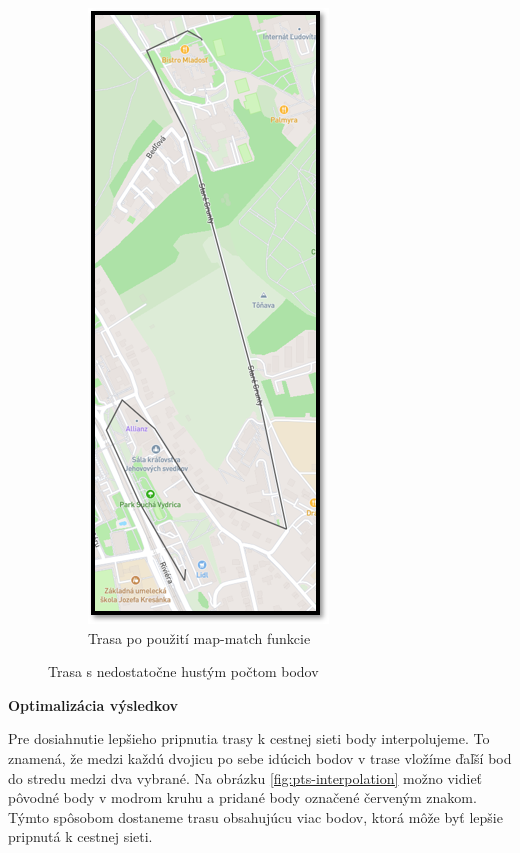 \begin{figure}[H]
\begin{subfigure}{0.45\textwidth}
        \includegraphics[width=.5\textwidth]{img/map-match rozdiel/malo bodov po.png}
        \caption{Trasa po použití map-match funkcie}
        \label{fig:map-match-low-points-after}
    \end{subfigure}
    \caption{Trasa s nedostatočne hustým počtom bodov}
    \label{fig:map-match-low-points}
\end{figure}

\noindent\textbf{Optimalizácia výsledkov}

Pre dosiahnutie lepšieho pripnutia trasy k cestnej sieti body interpolujeme. To znamená, že medzi každú dvojicu po sebe idúcich bodov v trase vložíme ďaľší bod do stredu medzi dva vybrané. Na obrázku \ref{fig:pts-interpolation} možno vidieť pôvodné body v modrom kruhu a pridané body označené červeným znakom. Týmto spôsobom dostaneme trasu obsahujúcu viac bodov, ktorá môže byť lepšie pripnutá k cestnej sieti.  

